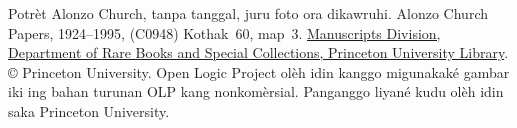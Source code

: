 Potrèt Alonzo Church, tanpa tanggal, juru foto ora dikawruhi.
Alonzo Church Papers, 1924--1995, (C0948) Kothak~60, map~3.
\href{http://rbsc.princeton.edu/divisions/manuscripts-division}{Manuscripts
Division, Department of Rare Books and Special Collections, Princeton
University Library}. \copyright{} Princeton University.
Open Logic Project olèh idin kanggo migunakaké gambar iki ing
bahan turunan OLP kang nonkomèrsial. Panganggo liyané kudu
olèh idin saka Princeton University.
